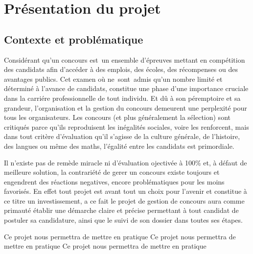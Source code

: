 \section{Présentation du projet}
\subsection{Contexte et problématique}
\setlength{\parindent}{5ex}
Considérant qu’un concours est un ensemble d'épreuves mettant en compétition des candidats afin d’accéder à des emplois, des écoles, des récompenses ou des avantages publics. Cet examen où ne sont admis qu'un nombre limité et déterminé à l'avance de candidats, constitue une phase d’une importance cruciale dans la carriére professionnelle de tout individu. Et dû à son péremptoire et sa grandeur, l’organisation et la gestion du concours demeurent une perplexité pour tous les organisateurs. Les concours (et plus généralement la sélection) sont critiqués parce qu'ils reproduisent les inégalités sociales, voire les renforcent, mais dans tout critère d'évaluation qu'il s'agisse de la culture générale, de l'histoire, des langues ou même des maths, l’égalité entre les candidats est primordiale.
\newline\indent

Il n'existe pas de remède miracle ni d'évaluation ojectivée à 100\% et, à défaut de meilleure solution, la contrariété de gerer un concours existe toujours et engendrent des réactions negatives, encore problématiques pour les moins favorisés.
En effet tout projet est avant tout un choix pour l'avenir et constitue à ce titre un investissement, a ce fait le projet de gestion de concours aura comme primauté établir une démarche claire et précise permettant à tout candidat de postuler sa candidature, ainsi que le suivi de son dossier dans toutes ses étapes.
\newline\indent

Ce projet nous permettra de mettre en pratique Ce projet nous permettra de mettre en pratique Ce projet nous permettra de mettre en pratique

